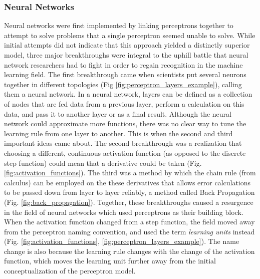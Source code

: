 \subsubsection{Neural Networks}
\label{sec:neural_networks}
Neural networks were first implemented by linking perceptrons together to attempt to solve problems that a single perceptron seemed unable to solve. While initial attempts did not indicate that this approach yielded a distinctly superior model, three major breakthroughs were integral to the uphill battle that neural network researchers had to fight in order to regain recognition in the machine learning field. The first breakthrough came when scientists put several neurons together in different topologies (Fig \ref{fig:perceptron_layers_example}), calling them a neural network. In a neural network, layers can be defined as a collection of nodes that are fed data from a previous layer, perform a calculation on this data, and pass it to another layer or as a final result.  Although the neural network could approximate more functions, there was no clear way to tune the learning rule from one layer to another. This is when the second and third important ideas came about. The second breakthrough was a realization that choosing a different, continuous activation function (as opposed to the discrete step function) could mean that a derivative could be taken (Fig. \ref{fig:activation_functions}). The third was a method by which the chain rule (from calculus) can be employed on the these derivatives that allows error calculations to be passed down from layer to layer reliably, a method called Back Propagation (Fig. \ref{fig:back_propagation}). Together, these breakthroughs caused a resurgence in the field of neural networks which used perceptrons as their building block. When the activation function changed from a step function, the field moved away from the perceptron naming convention, and used the term \textit{learning units} instead (Fig. \ref{fig:activation_functions}, \ref{fig:perceptron_layers_example}). The name change is also because the learning rule changes with the change of the activation function, which moves the learning unit further away from the initial conceptualization of the perceptron model.


